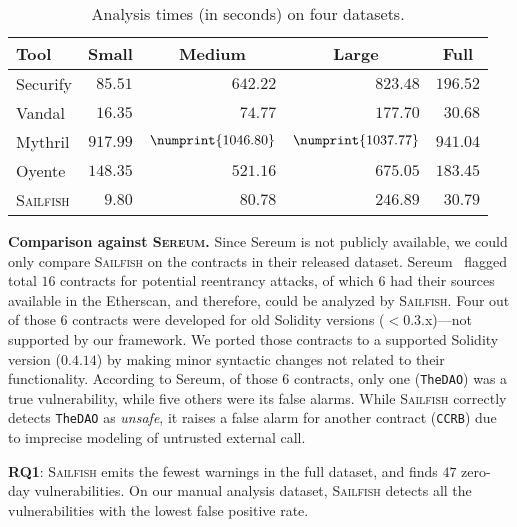 \documentclass[conference, romanappendices]{tex/IEEEtran}
\theoremstyle{bfnote}
\newcommand{\toolname}{\textsc{Sailfish}\xspace}
\newcommand{\oyente}{{\sc Oyente}\xspace}
\newcommand{\securify}{{\sc Securify}\xspace}
\newcommand{\sereum}{{\sc Sereum}\xspace}
\newcommand{\vandal}{{\sc Vandal}\xspace}
\newcommand{\solidity}{{\sc Solidity}\xspace}
\newcommand{\etherscan}{{\sc Etherscan}\xspace}
\newcommand{\mythril}{{\sc Mythril}\xspace}
\let\num\numprint
\newcommand{\zeroDays}{47}
\newcommand{\securifyAnalysisTimeSmall}{85.51}
\newcommand{\securifyAnalysisTimeMedium}{642.22}
\newcommand{\securifyAnalysisTimeLarge}{823.48}
\newcommand{\securifyAnalysisTimeFull}{196.52}
\newcommand{\vandalAnalysisTimeSmall}{16.35}
\newcommand{\vandalAnalysisTimeMedium}{74.77}
\newcommand{\vandalAnalysisTimeLarge}{177.70}
\newcommand{\vandalAnalysisTimeFull}{30.68}
\newcommand{\mythrilAnalysisTimeSmall}{917.99}
\newcommand{\mythrilAnalysisTimeMedium}{1046.80}
\newcommand{\mythrilAnalysisTimeLarge}{1037.77}
\newcommand{\mythrilAnalysisTimeFull}{941.04}
\newcommand{\oyenteAnalysisTimeSmall}{148.35}
\newcommand{\oyenteAnalysisTimeMedium}{521.16}
\newcommand{\oyenteAnalysisTimeLarge}{675.05}
\newcommand{\oyenteAnalysisTimeFull}{183.45}
\newcommand{\clintAnalysisTimeSmall}{9.80}
\newcommand{\clintAnalysisTimeMedium}{80.78}
\newcommand{\clintAnalysisTimeLarge}{246.89}
\newcommand{\clintAnalysisTimeFull}{30.79}
\begin{document}
\begin{table}[]
	\centering
	\begin{tabular}{l|rrrr}
		\toprule
		\textbf{Tool} & \multicolumn{1}{c}{\textbf{Small}} & \multicolumn{1}{c}{\textbf{Medium}} & \multicolumn{1}{c}{\textbf{Large}} & \multicolumn{1}{c}{\textbf{Full}} \\
		\midrule 
		\rowcolor{black!10} \securify & $\securifyAnalysisTimeSmall$ & $\securifyAnalysisTimeMedium$ & $\securifyAnalysisTimeLarge$ & $\securifyAnalysisTimeFull$ \\
		\vandal & $\vandalAnalysisTimeSmall$ & $\vandalAnalysisTimeMedium$ & $\vandalAnalysisTimeLarge$ & $\vandalAnalysisTimeFull$ \\
		\rowcolor{black!10} \mythril & $\mythrilAnalysisTimeSmall$ & $\num{\mythrilAnalysisTimeMedium}$ & $\num{\mythrilAnalysisTimeLarge}$ & $\mythrilAnalysisTimeFull$ \\
		\oyente & $\oyenteAnalysisTimeSmall$ & $\oyenteAnalysisTimeMedium$ & $\oyenteAnalysisTimeLarge$ & $\oyenteAnalysisTimeFull$ \\ 
		\rowcolor{black!10} \toolname & $\clintAnalysisTimeSmall$ & $\clintAnalysisTimeMedium$ & $\clintAnalysisTimeLarge$ & $\clintAnalysisTimeFull$ \\
		\bottomrule
	\end{tabular}
	\vspace{-1.5mm}
	\caption{\small Analysis times (in seconds) on four datasets.
	}
	\label{tbl:performance}
	\vspace{-6.5mm}
\end{table}

\noindent
\textbf{Comparison against \textsc{Sereum}.}
Since \sereum is not publicly available, we could only compare \toolname{} on the contracts in their released dataset.
\sereum~\cite{sereum} flagged total $16$ contracts for potential reentrancy attacks, of which $6$ had their sources available in the \etherscan, and therefore, could be analyzed by \toolname.
Four out of those $6$ contracts were developed for old \solidity{} versions ($<$0.3.x)---not supported by our framework.
We ported those contracts to a supported \solidity{} version ($0.4.14$) by making minor syntactic changes not related to their functionality.
According to \sereum, of those $6$ contracts, only one (\texttt{TheDAO}) was a true vulnerability, while five others were its false alarms.
While \toolname{} correctly detects \texttt{TheDAO} as \textit{unsafe}, it raises a false alarm for another contract (\texttt{CCRB}) due to imprecise modeling of untrusted external call.
\begin{mdframed}[style=graybox]
	\textbf{RQ1}: \toolname emits the fewest warnings in the full dataset, and finds $\zeroDays$ zero-day vulnerabilities.
	On our manual analysis dataset, \toolname detects all the vulnerabilities with the lowest false positive rate.
\end{mdframed}
\end{document}
